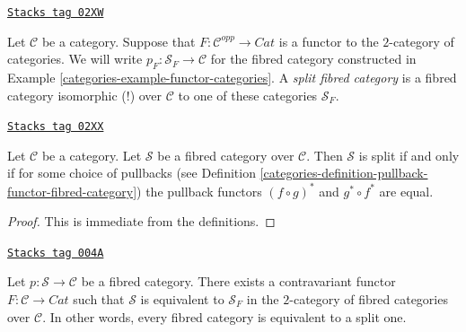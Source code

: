 \begin{definition}
\label{categories-definition-split-fibred-category}
\href{https://stacks.math.columbia.edu/tag/02XW}{\texttt{Stacks tag 02XW}}

Let $\mathcal{C}$ be a category.
Suppose that $F : \mathcal{C}^{opp} \to \textit{Cat}$ is a functor
to the $2$-category of categories.
We will write $p_F : \mathcal{S}_F \to \mathcal{C}$ for the
fibred category constructed in
Example \ref{categories-example-functor-categories}.
A {\it split fibred category} is a fibred category isomorphic (!)
over $\mathcal{C}$ to one of these categories {\it $\mathcal{S}_F$}.
\end{definition}

\begin{lemma}
\label{categories-lemma-when-split}
\href{https://stacks.math.columbia.edu/tag/02XX}{\texttt{Stacks tag 02XX}}

Let $\mathcal{C}$ be a category.
Let $\mathcal{S}$ be a fibred category over $\mathcal{C}$.
Then $\mathcal{S}$ is split if and only if for some choice
of pullbacks (see Definition \ref{categories-definition-pullback-functor-fibred-category})
the pullback functors
$(f \circ g)^*$ and $g^* \circ f^*$ are equal.
\end{lemma}

\begin{proof}
This is immediate from the definitions.
\end{proof}

\begin{lemma}
\label{categories-lemma-fibred-strict}
\href{https://stacks.math.columbia.edu/tag/004A}{\texttt{Stacks tag 004A}}

Let $ p : \mathcal{S} \to \mathcal{C}$ be a fibred category.
There exists a contravariant functor $F : \mathcal{C} \to \textit{Cat}$
such that $\mathcal{S}$ is equivalent to $\mathcal{S}_F$
in the $2$-category of fibred categories over $\mathcal{C}$. In other
words, every fibred category is equivalent to a split one.
\end{lemma}

